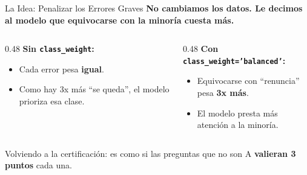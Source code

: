 \documentclass[aspectratio=169, 11pt]{beamer}
\begin{document}
\begin{frame}{La Idea: Penalizar los Errores Graves}
  \vspace{-4pt}
  {\footnotesize\color{arcaDark}\bfseries
    No cambiamos los datos. Le decimos al modelo que
    equivocarse con la minoría \textbf{cuesta más}.}

  \vspace{6pt}
  \begin{columns}[T]
    \begin{column}{0.48\textwidth}
      {\footnotesize\bfseries\color{textMuted}
        Sin \texttt{class\_weight}:}
      \vspace{4pt}

      {\scriptsize
      \begin{itemize}\setlength{\itemsep}{4pt}
        \item Cada error pesa \textbf{igual}.
        \item Como hay 3x más ``se queda'', el modelo
          prioriza esa clase.
      \end{itemize}
      }
    \end{column}

    \begin{column}{0.48\textwidth}
      {\footnotesize\bfseries\color{arcaRed}
        Con \texttt{class\_weight='balanced'}:}
      \vspace{4pt}

      {\scriptsize
      \begin{itemize}\setlength{\itemsep}{4pt}
        \item Equivocarse con ``renuncia'' pesa
          \textbf{3x más}.
        \item El modelo presta más atención a la minoría.
      \end{itemize}
      }
    \end{column}
  \end{columns}

  \vspace{6pt}
  {\footnotesize\color{arcaDark}
    \faLightbulb\hspace{4pt}
    Volviendo a la certificación: es como si las preguntas
    que no son A \textbf{valieran 3 puntos} cada una.}
\end{frame}
\end{document}
